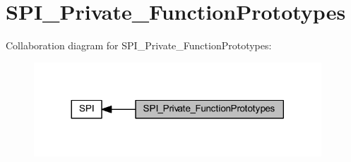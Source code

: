 \hypertarget{group___s_p_i___private___function_prototypes}{}\section{S\+P\+I\+\_\+\+Private\+\_\+\+Function\+Prototypes}
\label{group___s_p_i___private___function_prototypes}
Collaboration diagram for S\+P\+I\+\_\+\+Private\+\_\+\+Function\+Prototypes\+:
\nopagebreak
\begin{figure}[H]
\begin{center}
\leavevmode
\includegraphics[width=305pt]{group___s_p_i___private___function_prototypes}
\end{center}
\end{figure}
